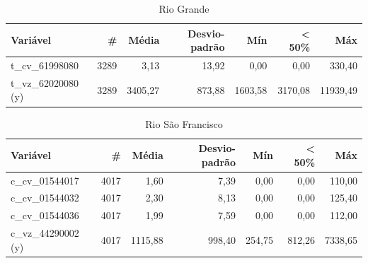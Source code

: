 \begin{table}[!h]
\centering \small
\caption{Rio Grande}
\begin{tabular}{|l|r|r|r|r|r|r|} \hline 
\textbf{Variável}   & \textbf{\#} & \textbf{Média} & \textbf{Desvio-padrão} & \textbf{Mín} & \textbf{< 50\%} & \textbf{Máx} \\\hline
t\_cv\_61998080     & 3289        & 3,13           & 13,92                  & 0,00         & 0,00            & 330,40       \\\hline
t\_vz\_62020080 (y) & 3289        & 3405,27        & 873,88                 & 1603,58      & 3170,08         & 11939,49     \\\hline
\end{tabular}
\label{tab:variaveis_rio_grande}
\end{table}

\begin{table}[!h]
\centering \small
\caption{Rio São Francisco}
\begin{tabular}{|l|r|r|r|r|r|r|} \hline 
\textbf{Variável}   & \textbf{\#} & \textbf{Média} & \textbf{Desvio-padrão} & \textbf{Mín} & \textbf{< 50\%} & \textbf{Máx} \\\hline
c\_cv\_01544017     & 4017        & 1,60           & 7,39                   & 0,00         & 0,00            & 110,00       \\\hline
c\_cv\_01544032     & 4017        & 2,30           & 8,13                   & 0,00         & 0,00            & 125,40       \\\hline
c\_cv\_01544036     & 4017        & 1,99           & 7,59                   & 0,00         & 0,00            & 112,00       \\\hline
c\_vz\_44290002 (y) & 4017        & 1115,88        & 998,40                 & 254,75       & 812,26          & 7338,65      \\\hline
\end{tabular}
\label{tab:variaveis_rio_sao_francisco}
\end{table}
\clearpage

